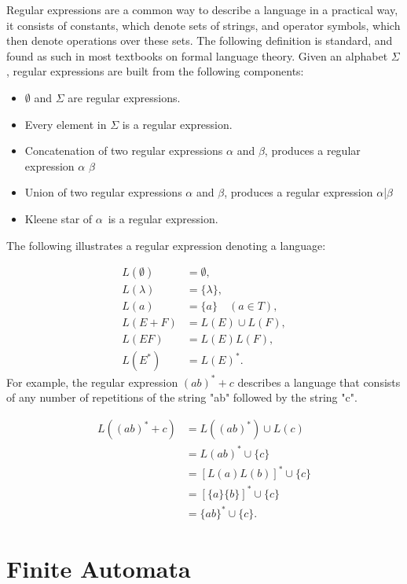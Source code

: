 Regular expressions are a common way to describe a language in a practical way, 
it consists of constants, which denote sets of strings, and operator symbols, which then denote operations over these sets. 
The following definition is standard, and found as such in most textbooks on formal language theory.
Given an alphabet \( \Sigma \), regular expressions are built from the following components:
\begin{itemize}
    \item \(\emptyset\) and \( \Sigma \) are regular expressions.
    \item Every element in \( \Sigma \) is a regular expression.
    \item Concatenation of two regular expressions \(\alpha\) and \(\beta\), produces a regular expression \(\alpha\) \(\beta\)
    \item Union of two regular expressions \(\alpha\) and \(\beta\), produces a regular expression \(\alpha\)|\(\beta\)
    \item Kleene star of \(\alpha\)\ is a regular expression.
\end{itemize}
The following illustrates a regular expression denoting a language:

\begin{align*}
L(\emptyset) &= \emptyset, \\
L(\lambda) &= \{\lambda\}, \\
L(a) &= \{a\} \quad (a \in T), \\
L(E + F) &= L(E) \cup L(F), \\
L(EF) &= L(E)L(F), \\
L(E^*) &= L(E)^*.
\end{align*}
For example, the regular expression \( (ab)^* + c \) describes a language that consists of any number of repetitions of the string "ab" followed by the string "c".

\begin{align*}
L((ab)^* + c) &= L((ab)^*) \cup L(c) \\
              &= L(ab)^* \cup \{c\} \\
              &= [L(a)L(b)]^* \cup \{c\} \\
              &= [\{a\}\{b\}]^* \cup \{c\} \\
              &= \{ab\}^* \cup \{c\}.
\end{align*}

\section{Finite Automata}

